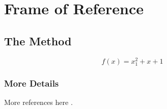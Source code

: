 \chapter{Frame of Reference} \label{chap:frameofreference}
\lipsum[13-14]

\section{The Method}

\lipsum[1]

\begin{equation}
\label{eq_the_method}
    f(x) = x_1^2 + x + 1
\end{equation}

\lipsum[2]

\subsection{More Details}

More references here \cite{krishnamurthy2003manageroverview,dedrick2006scope,henkel2006revealingemblinux,fitzgerald2003trencheslessons,entrywithurl}.

\lipsum[15-19]